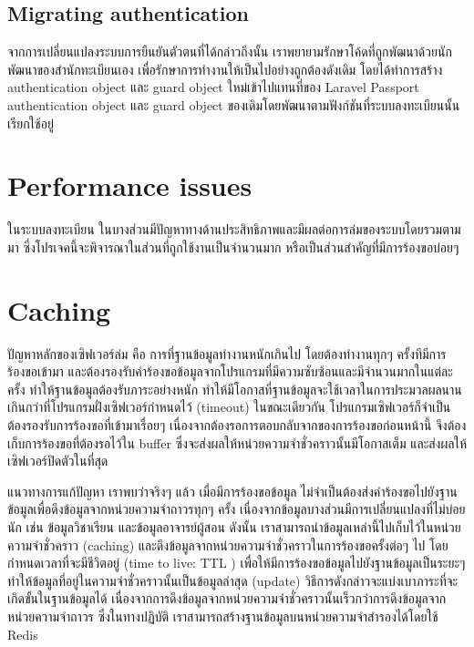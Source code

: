 \subsection{Migrating authentication}
จากการเปลี่ยนแปลงระบบการยืนยันตัวตนที่ได้กล่าวถึงนั้น เราพยายามรักษาโค้ดที่ถูกพัฒนาด้วยนักพัฒนาของสำนักทะเบียนเอง เพื่อรักษาการทำงานให้เป็นไปอย่างถูกต้องดังเดิม โดยได้ทำการสร้าง authentication object และ guard object ใหม่เข้าไปแทนที่ของ Laravel Passport authentication object และ guard object ของเดิมโดยพัฒนาตามฟังก์ชันที่ระบบลงทะเบียนนั้นเรียกใช้อยู่

\section{Performance issues}
ในระบบลงทะเบียน ในบางส่วนมีปัญหาทางด้านประสิทธิภาพและมีผลต่อการล่มของระบบโดยรวมตามมา ซี่งโปรเจคนี้จะพิจารณาในส่วนที่ถูกใช้งานเป็นจำนวนมาก หรือเป็นส่วนสำคัญที่มีการร้องขอบ่อยๆ

\section{Caching}

ปัญหาหลักของเซิฟเวอร์ล่ม คือ การที่ฐานข้อมูลทำงานหนักเกินไป โดยต้องทำงานทุกๆ ครั้งทีมีการร้องขอเข้ามา และต้องรองรับคำร้องขอข้อมูลจากโปรแกรมที่มีความซับซ้อนและมีจำนวนมากในแต่ละครั้ง ทำให้ฐานข้อมูลต้องรับภาระอย่างหนัก 
ทำให้มีโอกาสที่ฐานข้อมูลจะใช้เวลาในการประมวลผลนานเกินกว่าที่โปรแกรมฝั่งเซิฟเวอร์กำหนดไว้ (timeout) ในขณะเดียวกัน โปรแกรมเซิฟเวอร์ก็จำเป็นต้องรองรับการร้องขอที่เข้ามาเรื่อยๆ เนื่องจากต้องรอการตอบกลับจากของการร้องขอก่อนหน้านี้ จึงต้องเก็บการร้องขอที่ต้องรอไว้ใน buffer ซึ่งจะส่งผลให้หน่วยความจำชั่วคราวนั้นมีโอกาสเต็ม และส่งผลให้เซิฟเวอร์ปิดตัวในที่สุด

แนวทางการแก้ปัญหา เราพบว่าจริงๆ แล้ว เมื่อมีการร้องขอข้อมูล ไม่จำเป็นต้องส่งคำร้องขอไปยังฐานข้อมูลเพื่อดึงข้อมูลจากหน่วยความจำถาวรทุกๆ ครั้ง เนื่องจากข้อมูลบางส่วนมีการเปลี่ยนแปลงที่ไม่บ่อยนัก เช่น ข้อมูลวิชาเรียน และข้อมูลอาจารย์ผู้สอน ดังนั้น เราสามารถนำข้อมูลเหล่านี้ไปเก็บไว้ในหน่วยความจำชั่วคราว (caching) และดึงข้อมูลจากหน่วยความจำชั่วคราวในการร้องขอครั้งต่อๆ ไป โดยกำหนดเวลาที่จะมีชีวิตอยู่ (time to live: TTL \cite{ttl}) เพื่อให้มีการร้องขอข้อมูลไปยังฐานข้อมูลเป็นระยะๆ ทำให้ข้อมูลที่อยู่ในความจำชั่วคราวนั้นเป็นข้อมูลล่าสุด (update) วิธีการดังกล่าวจะแบ่งเบาภาระที่จะเกิดขั้นในฐานข้อมูลได้ เนื่องจากการดึงข้อมูลจากหน่วยความจำชั่วคราวนั้นเร็วกว่าการดึงข้อมูลจากหน่วยความจำถาวร ซึ่งในทางปฏิบัติ เราสามารถสร้างฐานข้อมูลบนหน่วยความจำสำรองได้โดยใช้ Redis \cite{redis}

